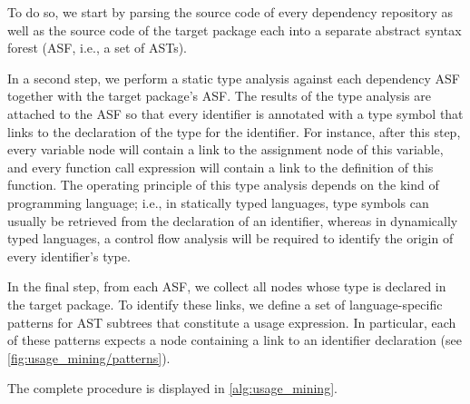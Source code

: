 To do so, we start by parsing the source code of every dependency repository as well as the source code of the target package each into a separate abstract syntax forest (ASF, i.e., a set of ASTs).

In a second step, we perform a static type analysis against each dependency ASF together with the target package's ASF.
The results of the type analysis are attached to the ASF so that every identifier is annotated with a type symbol that links to the declaration of the type for the identifier.
For instance, after this step, every variable node will contain a link to the assignment node of this variable, and every function call expression will contain a link to the definition of this function.
The operating principle of this type analysis depends on the kind of programming language; i.e., in statically typed languages, type symbols can usually be retrieved from the declaration of an identifier, whereas in dynamically typed languages, a control flow analysis will be required to identify the origin of every identifier's type.

In the final step, from each ASF, we collect all nodes whose type is declared in the target package.
To identify these links, we define a set of language-specific patterns for AST subtrees that constitute a usage expression.
In particular, each of these patterns expects a node containing a link to an identifier declaration (see \cref{fig:usage_mining/patterns}).

The complete procedure is displayed in \cref{alg:usage_mining}.
